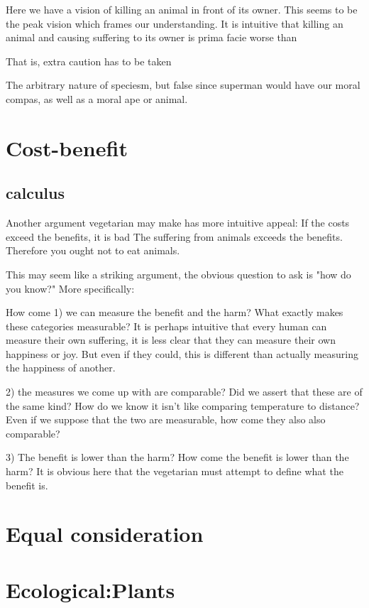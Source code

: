 \documentclass[12pt]{report}
\numberwithin{equation}{section}
\begin{document}
Here we have a vision of killing an animal in front of its owner. This seems to be the peak vision which frames our understanding. It is intuitive that killing an animal and causing suffering to its owner is prima facie worse than 


That is, extra caution has to be taken

The arbitrary nature of speciesm, but false since superman would have our moral compas, as well as a moral ape or animal. 

\section{Cost-benefit}

\subsection{calculus}

Another argument vegetarian may make has more intuitive appeal:
If the costs exceed the benefits, it is bad
The suffering from animals exceeds the benefits.
Therefore you ought not to eat animals. 

This may seem like a striking argument, the obvious question to ask is "how do you know?" More specifically:

How come 1) we can measure the benefit and the harm? What exactly makes these categories measurable? It is perhaps intuitive that every human can measure their own suffering, it is less clear that they can measure their own happiness or joy. But even if they could, this is different than actually measuring the happiness of another. 

2) the measures we come up with are comparable? Did we assert that these are of the same kind? How do we know it isn't like comparing temperature to distance? Even if we suppose that the two are measurable, how come they also also comparable?  

3) The benefit is lower than the harm? How come the benefit is lower than the harm? It is obvious here that the vegetarian must attempt to define what the benefit is. 

\section{Equal consideration}

\section{Ecological:Plants}
\end{document}
